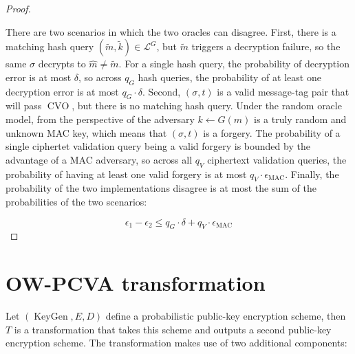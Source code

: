 \documentclass{article}
\newcommand{\keygen}{\operatorname{KeyGen}}
\newcommand{\pk}{\operatorname{pk}}
\newcommand{\cvo}{\operatorname{CVO}}
\begin{document}
\begin{proof}
\begin{multicols}{2}
        \begin{algorithm}[H]
            \caption{$\cvo_1$}
            \SetAlgoLined
            \If{
                $\exists (\tilde{m}, \tilde{k}) \in \mathcal{L}^G$ s.t.
                $E(\pk, \tilde{m}) = c$ and $V(\tilde{k}, \sigma, t) = 1$
            }{
                \Return{$1$}\;
            }
            \;
        \end{algorithm}
    \end{multicols}

    There are two scenarios in which the two oracles can disagree. First, there is a matching hash query $(\tilde{m}, \tilde{k}) \in \mathcal{L}^G$, but $\tilde{m}$ triggers a decryption failure, so the same $\sigma$ decrypts to $\hat{m} \neq \tilde{m}$. For a single hash query, the probability of decryption error is at most $\delta$, so across $q_G$ hash queries, the probability of at least one decryption error is at most $q_G \cdot \delta$. Second, $(\sigma, t)$ is a valid message-tag pair that will pass $\cvo$, but there is no matching hash query. Under the random oracle model, from the perspective of the adversary $k \leftarrow G(m)$ is a truly random and unknown MAC key, which means that $(\sigma, t)$ is a forgery. The probability of a single ciphertet validation query being a valid forgery is bounded by the advantage of a MAC adversary, so across all $q_V$ ciphertext validation queries, the probability of having at least one valid forgery is at most $q_V\cdot\epsilon_\text{MAC}$. Finally, the probability of the two implementations disagree is at most the sum of the probabilities of the two scenarios:

    \begin{equation*}
        \epsilon_1 - \epsilon_2 \leq q_G \cdot \delta + q_V \cdot \epsilon_\text{MAC}
    \end{equation*}



\end{proof}

\section{OW-PCVA transformation}
Let $(\keygen, E, D)$ define a probabilistic public-key encryption scheme, then $T$ is a transformation that takes this scheme and outputs a second public-key encryption scheme. The transformation makes use of two additional components:
\end{document}
